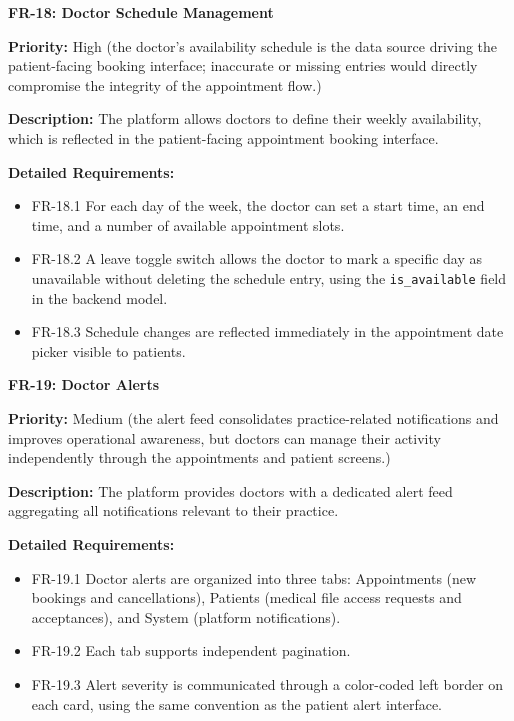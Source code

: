 \medskip

\textbf{FR-18: Doctor Schedule Management}

\textbf{Priority:} High (the doctor's availability schedule is the data source driving the patient-facing booking interface; inaccurate or missing entries would directly compromise the integrity of the appointment flow.)

\textbf{Description:} The platform allows doctors to define their weekly availability,
which is reflected in the patient-facing appointment booking interface.

\textbf{Detailed Requirements:}
\begin{itemize}
    \item FR-18.1 \; For each day of the week, the doctor can set a start time,
    an end time, and a number of available appointment slots.
    \item FR-18.2 \; A leave toggle switch allows the doctor to mark a specific day as
    unavailable without deleting the schedule entry, using the \texttt{is\_available}
    field in the backend model.
    \item FR-18.3 \; Schedule changes are reflected immediately in the appointment
    date picker visible to patients.
\end{itemize}

\medskip

\textbf{FR-19: Doctor Alerts}

\textbf{Priority:} Medium (the alert feed consolidates practice-related notifications and improves operational awareness, but doctors can manage their activity independently through the appointments and patient screens.)

\textbf{Description:} The platform provides doctors with a dedicated alert feed
aggregating all notifications relevant to their practice.

\textbf{Detailed Requirements:}
\begin{itemize}
    \item FR-19.1 \; Doctor alerts are organized into three tabs: Appointments
    (new bookings and cancellations), Patients (medical file access requests and
    acceptances), and System (platform notifications).
    \item FR-19.2 \; Each tab supports independent pagination.
    \item FR-19.3 \; Alert severity is communicated through a color-coded left
    border on each card, using the same convention as the patient alert interface.
\end{itemize}

